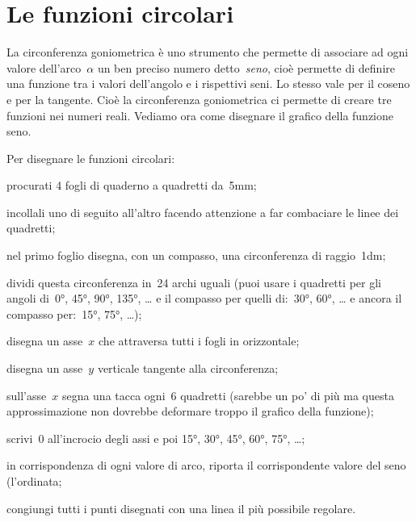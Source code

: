\section{Le funzioni circolari}
\label{sec:gonio_funzionicircolari}

La circonferenza goniometrica è uno strumento che permette di associare ad 
ogni valore dell'arco~$\alpha$ un ben preciso numero detto~\emph{seno},
cioè permette di definire una funzione tra i valori dell'angolo e i rispettivi
seni. Lo stesso vale per il coseno e per la tangente. 
Cioè la circonferenza goniometrica ci permette di creare tre funzioni nei 
numeri reali. Vediamo ora come disegnare il grafico della funzione seno.

\begin{procedura}
 Per disegnare le funzioni circolari:
 \begin{enumeratea}
  \item procurati 4 fogli di quaderno a quadretti da~5mm;
  \item incollali uno di seguito all'altro 
   facendo attenzione a far combaciare le linee dei quadretti;
  \item nel primo foglio disegna, con un compasso, una circonferenza di
   raggio~1dm;
  \item dividi questa circonferenza in~24 archi uguali 
   (puoi usare i quadretti per gli angoli di~0°, 45°, 90°, 135°, \dots 
   e il compasso per quelli di:~30°, 60°, \dots
   e ancora il compasso per:~15°, 75°, \dots);
  \item disegna un asse~$x$ che attraversa tutti i fogli in orizzontale;
  \item disegna un asse~$y$ verticale tangente alla circonferenza;
  \item sull'asse~$x$ segna una tacca ogni~6 quadretti 
   (sarebbe un po' di più ma questa approssimazione non dovrebbe deformare 
   troppo il grafico della funzione);
  \item scrivi~0 all'incrocio degli assi e poi 15°, 30°, 45°, 60°, 75°, \dots;
  \item in corrispondenza di ogni valore di arco, riporta il corrispondente
   valore del seno (l'ordinata;
  \item congiungi tutti i punti disegnati con una linea il più possibile 
   regolare.
 \end{enumeratea}
\end{procedura}

